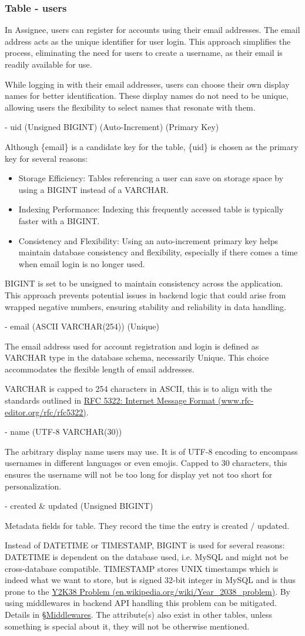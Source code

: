 \documentclass[12pt]{report}
\newcommand{\n}{\par}
\newcommand{\br}{\n\vspace{1 em}\n}
\begin{document}
\subsubsection{Table - users} \label{data-layer.design.user-system.users}
In Assignee, users can register for accounts using their email addresses.
The email address acts as the unique identifier for user login.
This approach simplifies the process, eliminating the need for users to create a username,
as their email is readily available for use.\n
While logging in with their email addresses, users can choose their own display names for better identification.
These display names do not need to be unique, allowing users the flexibility to select names that resonate with them.
\br
- uid (Unsigned BIGINT) (Auto-Increment) (Primary Key)\n
Although \{email\} is a candidate key for the table, \{uid\} is chosen as the primary key for several reasons:\n
\begin{itemize}
	\item Storage Efficiency: Tables referencing a user can save on storage space by using a BIGINT instead of a VARCHAR.
	\item Indexing Performance: Indexing this frequently accessed table is typically faster with a BIGINT.
	\item Consistency and Flexibility: Using an auto-increment primary key helps maintain database consistency and flexibility, especially if there comes a time when email login is no longer used.
\end{itemize}\n
BIGINT is set to be unsigned to maintain consistency across the application.
This approach prevents potential issues in backend logic that could arise from wrapped negative numbers,
ensuring stability and reliability in data handling.
\br
- email (ASCII VARCHAR(254)) (Unique)\n
The email address used for account registration and login is defined as VARCHAR type in the database schema, necessarily Unique.
This choice accommodates the flexible length of email addresses.\n
VARCHAR is capped to 254 characters in ASCII, this is to align with the standards outlined in
\href{https://www.rfc-editor.org/rfc/rfc5322}{RFC 5322: Internet Message Format (www.rfc-editor.org/rfc/rfc5322)}.
\br
- name (UTF-8 VARCHAR(30))\n
The arbitrary display name users may use.
It is of UTF-8 encoding to encompass usernames in different languages or even emojis.
Capped to 30 characters, this ensures the username will not be too long for display yet not too short for personalization.
\br
- created \& updated (Unsigned BIGINT)\n
Metadata fields for table. They record the time the entry is created / updated.\n
Instead of DATETIME or TIMESTAMP, BIGINT is used for several reasons:
DATETIME is dependent on the database used, i.e. MySQL and might not be cross-database compatible.
TIMESTAMP stores UNIX timestamps which is indeed what we want to store,
but is signed 32-bit integer in MySQL and is thus prone to the \href{https://en.wikipedia.org/wiki/Year_2038_problem}{Y2K38 Problem (en.wikipedia.org\-/wiki/Year\_2038\_problem)}.
By using middlewares in backend API handling this problem can be mitigated.
Details in \S \hyperref[application-layer.design.middlewares]{Middlewares}.
The attribute(s) also exist in other tables, unless something is special about it, they will not be otherwise mentioned.
\end{document}
